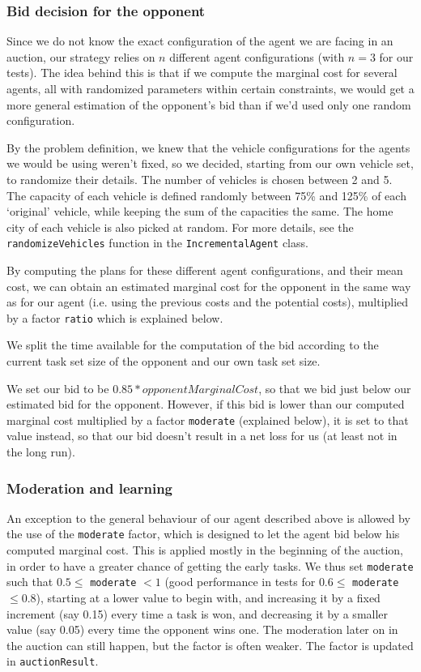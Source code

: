 \documentclass[12pt,a4paper]{article}
\begin{document}
\subsubsection*{Bid decision for the opponent}
Since we do not know the exact configuration of the agent we are facing in an auction, our strategy relies on $n$ different agent configurations (with $n=3$ for our tests). The idea behind this is that if we compute the marginal cost for several agents, all with randomized parameters within certain constraints, we would get a more general estimation of the opponent's bid than if we'd used only one random configuration. 

By the problem definition, we knew that the vehicle configurations for the agents we would be using weren't fixed, so we decided, starting from our own vehicle set, to randomize their details. The number of vehicles is chosen between 2 and 5. The capacity of each vehicle is defined randomly between 75\% and 125\% of each `original' vehicle, while keeping the sum of the capacities the same. The home city of each vehicle is also picked at random. For more details, see the \texttt{randomizeVehicles} function in the \texttt{IncrementalAgent} class.

By computing the plans for these different agent configurations, and their mean cost, we can obtain an estimated marginal cost for the opponent in the same way as for our agent (i.e. using the previous costs and the potential costs), multiplied by a factor \texttt{ratio} which is explained below.

We split the time available for the computation of the bid according to the current task set size of the opponent and our own task set size.

We set our bid to be $0.85*opponentMarginalCost$, so that we bid just below our estimated bid for the opponent. However, if this bid is lower than our computed marginal cost multiplied by a factor \texttt{moderate} (explained below), it is set to that value instead, so that our bid doesn't result in a net loss for us (at least not in the long run).

\subsubsection*{Moderation and learning}
An exception to the general behaviour of our agent described above is allowed by the use of the \texttt{moderate} factor, which is designed to let the agent bid below his computed marginal cost. This is applied mostly in the beginning of the auction, in order to have a greater chance of getting the early tasks. We thus set \texttt{moderate} such that $0.5 \leq $ \texttt{moderate} $< 1$ (good performance in tests for $0.6 \leq$ \texttt{moderate} $\leq 0.8$), starting at a lower value to begin with, and increasing it by a fixed increment (say 0.15) every time a task is won, and decreasing it by a smaller value (say 0.05) every time the opponent wins one. The moderation later on in the auction can still happen, but the factor is often weaker. The factor is updated in \texttt{auctionResult}.
\end{document}
